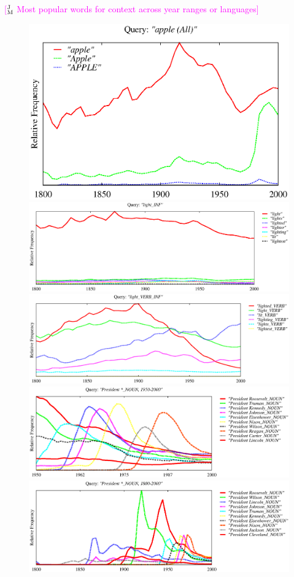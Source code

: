 \documentclass[11pt]{article}
\newcommand{\jmcomment}[1]{\textcolor{magenta}{[$^{\textsc{J}}_{\textsc{M}}$ #1]}}
\begin{document}
\jmcomment{Most popular words for context across year ranges or languages}
\begin{figure}
\centering
\includegraphics[width=.48\textwidth]{graphs/apple}
\includegraphics[width=\textwidth]{graphs/light_INF}
\includegraphics[width=\textwidth]{graphs/light_INF_VERB}
\includegraphics[width=\textwidth]{graphs/President*1950}
\includegraphics[width=\textwidth]{graphs/President*1800}

\end{figure}
\end{document}
